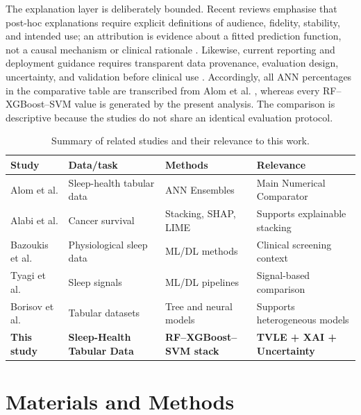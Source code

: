 \documentclass{elektr}
\begin{document}
The explanation layer is deliberately bounded. Recent reviews emphasise that post-hoc explanations require explicit definitions of audience, fidelity, stability, and intended use; an attribution is evidence about a fitted prediction function, not a causal mechanism or clinical rationale \cite{jung2023,allen2024}. Likewise, current reporting and deployment guidance requires transparent data provenance, evaluation design, uncertainty, and validation before clinical use \cite{tripodai2024,futureai2025}. Accordingly, all ANN percentages in the comparative table are transcribed from Alom et al. \cite{alom2024}, whereas every RF--XGBoost--SVM value is generated by the present analysis. The comparison is descriptive because the studies do not share an identical evaluation protocol.
\begin{table}[H]
\centering
\caption{Summary of related studies and their relevance to this work.}
\label{tab:related_work}
\small
\setlength{\tabcolsep}{4pt}
\renewcommand{\arraystretch}{1.05}
\begin{tabularx}{\textwidth}{@{}L{0.18\textwidth}L{0.22\textwidth}L{0.23\textwidth}Y@{}}
\toprule
Study & Data/task & Methods & Relevance \\
\midrule

Alom et al. \cite{alom2024} &
Sleep-health tabular data &
ANN Ensembles &
Main Numerical Comparator \\

Alabi et al. \cite{alabi2023} &
Cancer survival &
Stacking, SHAP, LIME &
Supports explainable stacking \\

Bazoukis et al. \cite{bazoukis2023} &
Physiological sleep data &
ML/DL methods &
Clinical screening context \\

Tyagi et al. \cite{tyagi2023} &
Sleep signals &
ML/DL pipelines &
Signal-based comparison \\

Borisov et al. \cite{borisov2024} &
Tabular datasets &
Tree and neural models &
Supports heterogeneous models \\

\textbf{This study} &
\textbf{Sleep-Health Tabular Data} &
\textbf{RF--XGBoost--SVM stack} &
\textbf{TVLE + XAI + Uncertainty} \\

\bottomrule
\end{tabularx}
\end{table}
\section{Materials and Methods}
\end{document}
